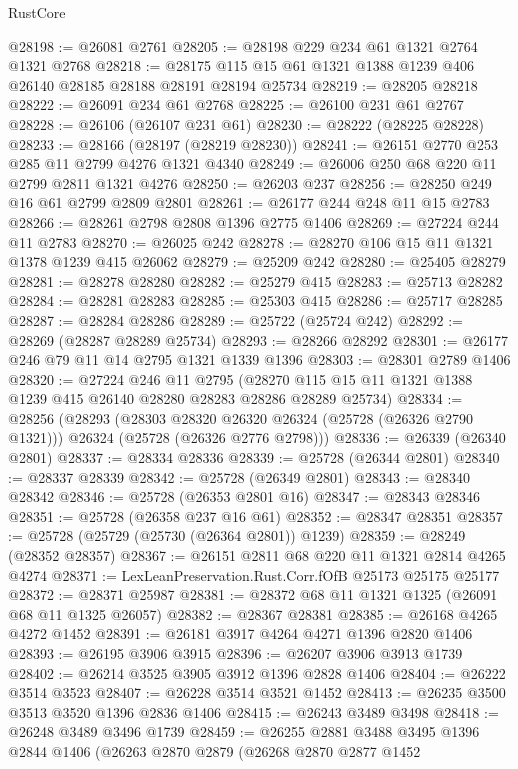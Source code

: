 \begin{lexlean}{RustCore}
\begin{coremodule}
@28198 := @26081 @2761
@28205 := @28198 @229 @234 @61 @1321 @2764 @1321 @2768
@28218 := @28175 @115 @15 @61 @1321 @1388 @1239 @406 @26140 @28185 @28188 @28191 @28194 @25734
@28219 := @28205 @28218
@28222 := @26091 @234 @61 @2768
@28225 := @26100 @231 @61 @2767
@28228 := @26106 (@26107 @231 @61)
@28230 := @28222 (@28225 @28228)
@28233 := @28166 (@28197 (@28219 @28230))
@28241 := @26151 @2770 @253 @285 @11 @2799 @4276 @1321 @4340
@28249 := @26006 @250 @68 @220 @11 @2799 @2811 @1321 @4276
@28250 := @26203 @237
@28256 := @28250 @249 @16 @61 @2799 @2809 @2801
@28261 := @26177 @244 @248 @11 @15 @2783
@28266 := @28261 @2798 @2808 @1396 @2775 @1406
@28269 := @27224 @244 @11 @2783
@28270 := @26025 @242
@28278 := @28270 @106 @15 @11 @1321 @1378 @1239 @415 @26062
@28279 := @25209 @242
@28280 := @25405 @28279
@28281 := @28278 @28280
@28282 := @25279 @415
@28283 := @25713 @28282
@28284 := @28281 @28283
@28285 := @25303 @415
@28286 := @25717 @28285
@28287 := @28284 @28286
@28289 := @25722 (@25724 @242)
@28292 := @28269 (@28287 @28289 @25734)
@28293 := @28266 @28292
@28301 := @26177 @246 @79 @11 @14 @2795 @1321 @1339 @1396
@28303 := @28301 @2789 @1406
@28320 := @27224
    @246
    @11
    @2795
    (@28270 @115 @15 @11 @1321 @1388 @1239 @415 @26140 @28280 @28283 @28286 @28289 @25734)
@28334 := @28256
    (@28293
      (@28303 @28320 @26320 @26324 (@25728 (@26326 @2790 @1321)))
      @26324
      (@25728 (@26326 @2776 @2798)))
@28336 := @26339 (@26340 @2801)
@28337 := @28334 @28336
@28339 := @25728 (@26344 @2801)
@28340 := @28337 @28339
@28342 := @25728 (@26349 @2801)
@28343 := @28340 @28342
@28346 := @25728 (@26353 @2801 @16)
@28347 := @28343 @28346
@28351 := @25728 (@26358 @237 @16 @61)
@28352 := @28347 @28351
@28357 := @25728 (@25729 (@25730 (@26364 @2801)) @1239)
@28359 := @28249 (@28352 @28357)
@28367 := @26151 @2811 @68 @220 @11 @1321 @2814 @4265 @4274
@28371 := LexLeanPreservation.Rust.Corr.fOfB @25173 @25175 @25177
@28372 := @28371 @25987
@28381 := @28372 @68 @11 @1321 @1325 (@26091 @68 @11 @1325 @26057)
@28382 := @28367 @28381
@28385 := @26168 @4265 @4272 @1452
@28391 := @26181 @3917 @4264 @4271 @1396 @2820 @1406
@28393 := @26195 @3906 @3915
@28396 := @26207 @3906 @3913 @1739
@28402 := @26214 @3525 @3905 @3912 @1396 @2828 @1406
@28404 := @26222 @3514 @3523
@28407 := @26228 @3514 @3521 @1452
@28413 := @26235 @3500 @3513 @3520 @1396 @2836 @1406
@28415 := @26243 @3489 @3498
@28418 := @26248 @3489 @3496 @1739
@28459 := @26255
    @2881
    @3488
    @3495
    @1396
    @2844
    @1406
    (@26263
      @2870
      @2879
      (@26268
        @2870
        @2877
        @1452

\end{coremodule}
\end{lexlean}
